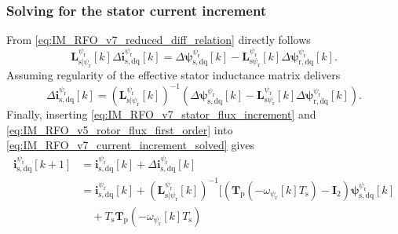 \begin{frame}
    \frametitle{Solving for the stator current increment}
    From \eqref{eq:IM_RFO_v7_reduced_diff_relation} directly follows
    \begin{equation}
        \bm{L}^{\psi_\mathrm{r}}_{\mathrm{s}|\psi_\mathrm{r}}[k]\Delta\bm{i}^{\psi_\mathrm{r}}_{\mathrm{s},\mathrm{dq}}[k]
        =\Delta\bm{\psi}^{\psi_\mathrm{r}}_{\mathrm{s},\mathrm{dq}}[k]
        -\bm{L}^{\psi_\mathrm{r}}_{\mathrm{s}\psi_\mathrm{r}}[k]\Delta\bm{\psi}^{\psi_\mathrm{r}}_{\mathrm{r},\mathrm{dq}}[k].
        \label{eq:IM_RFO_v7_current_increment_before_solve}
    \end{equation}\pause%
    Assuming regularity of the effective stator inductance matrix delivers
    \begin{equation}
        \Delta\bm{i}^{\psi_\mathrm{r}}_{\mathrm{s},\mathrm{dq}}[k]
        =\left(\bm{L}^{\psi_\mathrm{r}}_{\mathrm{s}|\psi_\mathrm{r}}[k]\right)^{-1}
        \left(\Delta\bm{\psi}^{\psi_\mathrm{r}}_{\mathrm{s},\mathrm{dq}}[k]
        -\bm{L}^{\psi_\mathrm{r}}_{\mathrm{s}\psi_\mathrm{r}}[k]\Delta\bm{\psi}^{\psi_\mathrm{r}}_{\mathrm{r},\mathrm{dq}}[k]\right).
        \label{eq:IM_RFO_v7_current_increment_solved}
    \end{equation}\pause%
    Finally, inserting \eqref{eq:IM_RFO_v7_stator_flux_increment} and \eqref{eq:IM_RFO_v5_rotor_flux_first_order} into \eqref{eq:IM_RFO_v7_current_increment_solved} gives
    \begin{equation}
        \begin{split}
            \bm{i}^{\psi_\mathrm{r}}_{\mathrm{s},\mathrm{dq}}[k+1]
             & =\bm{i}^{\psi_\mathrm{r}}_{\mathrm{s},\mathrm{dq}}[k]+\Delta\bm{i}^{\psi_\mathrm{r}}_{\mathrm{s},\mathrm{dq}}[k] \\
             & =\bm{i}^{\psi_\mathrm{r}}_{\mathrm{s},\mathrm{dq}}[k]
            +\left(\bm{L}^{\psi_\mathrm{r}}_{\mathrm{s}|\psi_\mathrm{r}}[k]\right)^{-1}\Bigg[
                                                                                           \left(\bm{T}_\mathrm{p}(-\omega_{\psi_\mathrm{r}}[k]T_\mathrm{s})-\bm{I}_2\right)\bm{\psi}^{\psi_\mathrm{r}}_{\mathrm{s},\mathrm{dq}}[k]\\
                                                                                           &\quad+T_\mathrm{s}\bm{T}_\mathrm{p}(-\omega_{\psi_\mathrm{r}}[k]T_\mathrm{s})

\end{split}
\end{equation}
\end{frame}
